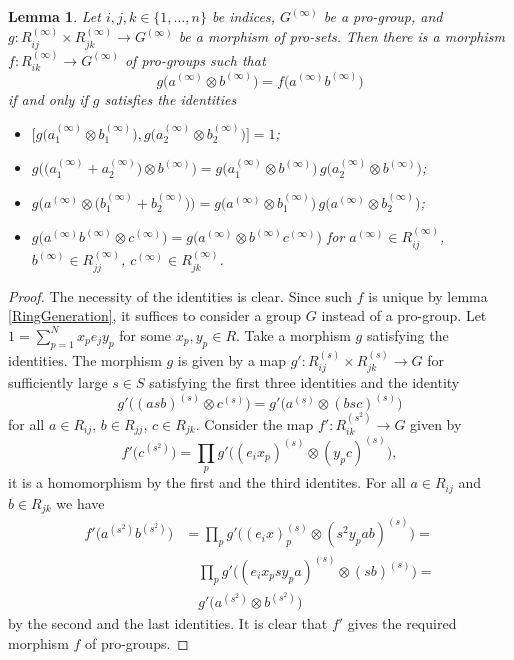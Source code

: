 \documentclass{article}
\newtheorem{lemma}{Lemma}
\newcommand{\rar}{\rightarrow}
\begin{document}
\begin{lemma}\label{RingPresentation}
Let \(i, j, k \in \{1, \ldots, n\}\) be indices, \(G^{(\infty)}\) be a pro-group, and \(g \colon R_{ij}^{(\infty)} \times R_{jk}^{(\infty)} \rar G^{(\infty)}\) be a morphism of pro-sets. Then there is a morphism \(f \colon R_{ik}^{(\infty)} \rar G^{(\infty)}\) of pro-groups such that
\[g\bigl(a^{(\infty)} \otimes b^{(\infty)}\bigr) = f\bigl(a^{(\infty)} b^{(\infty)}\bigr)\]
if and only if \(g\) satisfies the identities
\begin{itemize}
\item \(\bigl[g\bigl(a_1^{(\infty)} \otimes b_1^{(\infty)}\bigr), g\bigl(a_2^{(\infty)} \otimes b_2^{(\infty)}\bigr)\bigr] = 1\);
\item \(g\bigl(\bigl(a_1^{(\infty)} + a_2^{(\infty)}\bigr) \otimes b^{(\infty)}\bigr) = g\bigl(a_1^{(\infty)} \otimes b^{(\infty)}\bigr)\, g\bigl(a_2^{(\infty)} \otimes b^{(\infty)}\bigr)\);
\item \(g\bigl(a^{(\infty)} \otimes \bigl(b_1^{(\infty)} + b_2^{(\infty)}\bigr)\bigr) = g\bigl(a^{(\infty)} \otimes b_1^{(\infty)}\bigr)\, g\bigl(a^{(\infty)} \otimes b_2^{(\infty)}\bigr)\);
\item \(g\bigl(a^{(\infty)} b^{(\infty)} \otimes c^{(\infty)}\bigr) = g\bigl(a^{(\infty)} \otimes b^{(\infty)} c^{(\infty)}\bigr)\) for \(a^{(\infty)} \in R_{ij}^{(\infty)}\), \(b^{(\infty)} \in R_{jj}^{(\infty)}\), \(c^{(\infty)} \in R_{jk}^{(\infty)}\).
\end{itemize}
\end{lemma}
\begin{proof}
The necessity of the identities is clear. Since such \(f\) is unique by lemma \ref{RingGeneration}, it suffices to consider a group \(G\) instead of a pro-group. Let \(1 = \sum_{p = 1}^N x_p e_j y_p\) for some \(x_p, y_p \in R\). Take a morphism \(g\) satisfying the identities. The morphism \(g\) is given by a map \(g' \colon R_{ij}^{(s)} \times R_{jk}^{(s)} \rar G\) for sufficiently large \(s \in S\) satisfying the first three identities and the identity 
\[g'\bigl((asb)^{(s)} \otimes c^{(s)}\bigr) = g'\bigl(a^{(s)} \otimes (bsc)^{(s)}\bigr)\]
for all \(a \in R_{ij}\), \(b \in R_{jj}\), \(c \in R_{jk}\). Consider the map \(f' \colon R_{ik}^{(s^2)} \rar G\) given by
\[f'\bigl(c^{(s^2)}\bigr) = \prod_p g'\bigl((e_i x_p)^{(s)} \otimes (y_p c)^{(s)}\bigr),\]
it is a homomorphism by the first and the third identites. For all \(a \in R_{ij}\) and \(b \in R_{jk}\) we have
\begin{align*}
f'\bigl(a^{(s^2)} b^{(s^2)})
&= \prod_p g' \bigl( (e_ix)^{(s)}_p \otimes (s^2 y_p ab)^{(s)} \bigr) =\\
&\quad \prod_p g' \bigl( (e_i x_p s y_p a)^{(s)} \otimes (sb)^{(s)} \bigr) =\\
&\quad g'\bigl(a^{(s^2)} \otimes b^{(s^2)}\bigr)
\end{align*}
by the second and the last identities. It is clear that \(f'\) gives the required morphism \(f\) of pro-groups.
\end{proof}
\end{document}

